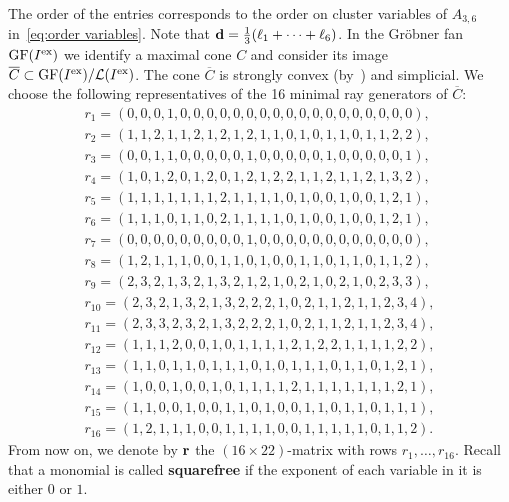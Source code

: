 \documentclass[pdftex]{sigma}%
\numberwithin{equation}{section}
\DeclareMathOperator{\GF}{GF}
\begin{document}
The order of the entries corresponds to the order on cluster variables of $A_{3,6}$ in~\eqref{eq:order variables}.
Note that ${\bf d}=\frac{1}{3}(\ell_1+\dots+\ell_6)$.
In the Gr\"obner fan $\GF(I^{\rm ex})$ we identify a maximal cone $C$ and consider its image $\overline{C}\subset \GF(I^{\rm ex})/\mathcal L(I^{\rm ex})$.
The cone $\overline{C}$ is strongly convex (by~) and simplicial.
We choose the following representatives of the 16 minimal ray generators of $\overline{C}$:
\begin{gather}
 r_{1}=(0, 0, 0, 1, 0, 0, 0, 0, 0, 0, 0, 0, 0, 0, 0, 0, 0, 0, 0, 0, 0, 0),\nonumber\\
 r_{2}=(1, 1, 2, 1, 1, 2, 1, 2, 1, 2, 1, 1, 0, 1, 0, 1, 1, 0, 1, 1, 2, 2),\nonumber\\
 r_{3}=(0, 0, 1, 1, 0, 0, 0, 0, 0, 1, 0, 0, 0, 0, 0, 1, 0, 0, 0, 0, 0, 1),\nonumber\\
 r_{4}=(1, 0, 1, 2, 0, 1, 2, 0, 1, 2, 1, 2, 2, 1, 1, 2, 1, 1, 2, 1, 3, 2),\nonumber\\
 r_{5}=(1, 1, 1, 1, 1, 1, 1, 2, 1, 1, 1, 1, 0, 1, 0, 0, 1, 0, 0, 1, 2, 1),\nonumber\\
 r_{6}=(1, 1, 1, 0, 1, 1, 0, 2, 1, 1, 1, 1, 0, 1, 0, 0, 1, 0, 0, 1, 2, 1),\nonumber\\
 r_{7}=(0, 0, 0, 0, 0, 0, 0, 0, 0, 1, 0, 0, 0, 0, 0, 0, 0, 0, 0, 0, 0, 0),\nonumber\\
 r_{8}=(1, 2, 1, 1, 1, 0, 0, 1, 1, 0, 1, 0, 0, 1, 1, 0, 1, 1, 0, 1, 1, 2),\nonumber\\
 r_{9}=(2, 3, 2, 1, 3, 2, 1, 3, 2, 1, 2, 1, 0, 2, 1, 0, 2, 1, 0, 2, 3, 3),\nonumber\\
r_{10}=(2, 3, 2, 1, 3, 2, 1, 3, 2, 2, 2, 1, 0, 2, 1, 1, 2, 1, 1, 2, 3, 4),\nonumber\\
r_{11}=(2, 3, 3, 2, 3, 2, 1, 3, 2, 2, 2, 1, 0, 2, 1, 1, 2, 1, 1, 2, 3, 4),\nonumber\\
r_{12}=(1, 1, 1, 2, 0, 0, 1, 0, 1, 1, 1, 1, 2, 1, 2, 2, 1, 1, 1, 1, 2, 2),\nonumber\\
r_{13}=(1, 1, 0, 1, 1, 0, 1, 1, 1, 0, 1, 0, 1, 1, 1, 0, 1, 1, 0, 1, 2, 1),\nonumber\\
r_{14}=(1, 0, 0, 1, 0, 0, 1, 0, 1, 1, 1, 1, 2, 1, 1, 1, 1, 1, 1, 1, 2, 1),\nonumber\\
r_{15}=(1, 1, 0, 0, 1, 0, 0, 1, 1, 0, 1, 0, 0, 1, 1, 0, 1, 1, 0, 1, 1, 1),\nonumber\\
r_{16}=(1, 2, 1, 1, 1, 0, 0, 1, 1, 1, 1, 0, 0, 1, 1, 1, 1, 1, 0, 1, 1, 2).\label{eq:rays of C}
\end{gather}
From now on, we denote by ${\bf r}$ the $(16\times 22)$-matrix with rows $r_1,\dots,r_{16}$.
Recall that a monomial is called {\bf squarefree} if the exponent of each variable in it is either $0$ or $1$.
\end{document}
